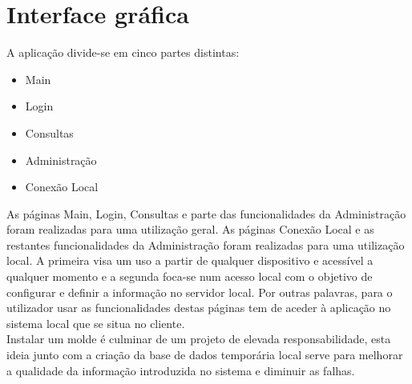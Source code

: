 \documentclass[11pt,twoside,a4paper]{report}
\begin{document}
\section{Interface gráfica}
A aplicação divide-se em cinco partes distintas:
\begin{itemize}[noitemsep]
	\item Main
	\item Login
	\item Consultas
	\item Administração
	\item Conexão Local
\end{itemize}
As páginas Main, Login, Consultas e parte das funcionalidades da Administração foram realizadas para uma utilização geral. As páginas Conexão Local e as restantes funcionalidades da Administração foram realizadas para uma utilização local. A primeira visa um uso a partir de qualquer dispositivo e acessível a qualquer momento e a segunda foca-se num acesso local com o objetivo de configurar e definir a informação no servidor local. Por outras palavras, para o utilizador usar as funcionalidades destas páginas tem de aceder à aplicação no sistema local que se situa no cliente.\\
Instalar um molde é culminar de um projeto de elevada responsabilidade, esta ideia junto com a criação da base de dados temporária local serve para melhorar a qualidade da informação introduzida no sistema e diminuir as falhas.\\
\end{document}
